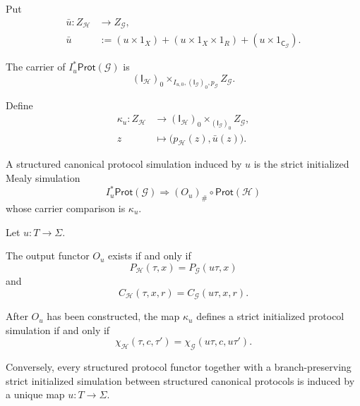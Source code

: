 Put
\[
\begin{aligned}
  \bar u:
  Z_{\mathcal H}
  &\longrightarrow
  Z_{\mathcal G},
  \\
  \bar u
  &:=
  (u\times1_X)
  +
  (u\times1_X\times1_R)
  +
  (u\times1_{\mathsf C_{\mathcal G}}).
\end{aligned}
\]

The carrier of \(I_u^*\mathsf{Prot}(\mathcal G)\) is
\[
  (\mathsf I_{\mathcal H})_0
  \times_{I_{u,0},(\mathsf I_{\mathcal G})_0,p_{\mathcal G}}
  Z_{\mathcal G}.
\]

Define
\[
\begin{aligned}
  \kappa_u:
  Z_{\mathcal H}
  &\longrightarrow
  (\mathsf I_{\mathcal H})_0
  \times_{(\mathsf I_{\mathcal G})_0}
  Z_{\mathcal G},
  \\
  z
  &\longmapsto
  \bigl(
    p_{\mathcal H}(z),
    \bar u(z)
  \bigr).
\end{aligned}
\]

\begin{definition}
\label{def:canonical-protocol-simulation}
A structured canonical protocol simulation induced by \(u\) is the strict initialized Mealy
simulation
\[
  I_u^*\mathsf{Prot}(\mathcal G)
  \Longrightarrow
  (O_u)_\#\circ\mathsf{Prot}(\mathcal H)
\]
whose carrier comparison is \(\kappa_u\).
\end{definition}

\begin{proposition}
\label{prop:canonical-protocol-simulation-equations}
Let \(u:T\to\Sigma\).

The output functor \(O_u\) exists if and only if
\[
  P_{\mathcal H}(\tau,x)
  =
  P_{\mathcal G}(u\tau,x)
\]
and
\[
  C_{\mathcal H}(\tau,x,r)
  =
  C_{\mathcal G}(u\tau,x,r).
\]

After \(O_u\) has been constructed, the map \(\kappa_u\) defines a strict initialized protocol
simulation if and only if
\[
  \chi_{\mathcal H}(\tau,c,\tau')
  =
  \chi_{\mathcal G}(u\tau,c,u\tau').
\]

Conversely, every structured protocol functor together with a branch-preserving strict initialized
simulation between structured canonical protocols is induced by a unique map \(u:T\to\Sigma\).
\end{proposition}

